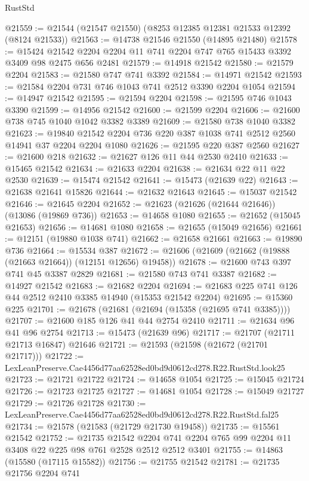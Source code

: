 \begin{lexlean}{RustStd}
\begin{coremodule}
@21559 := @21544 (@21547 @21550) (@8253 @12385 @12381 @21533 @12392 (@8124 @21533))
@21563 := @14738 @21546 @21550 (@14895 @21480)
@21578 := @15424 @21542 @2204 @2204 @11 @741 @2204 @747 @765 @15433 @3392 @3409 @98 @2475 @656 @2481
@21579 := @14918 @21542
@21580 := @21579 @2204
@21583 := @21580 @747 @741 @3392
@21584 := @14971 @21542
@21593 := @21584 @2204 @731 @746 @1043 @741 @2512 @3390 @2204 @1054
@21594 := @14947 @21542
@21595 := @21594 @2204
@21598 := @21595 @746 @1043 @3390
@21599 := @14956 @21542
@21600 := @21599 @2204
@21606 := @21600 @738 @745 @1040 @1042 @3382 @3389
@21609 := @21580 @738 @1040 @3382
@21623 := @19840 @21542 @2204 @736 @220 @387 @1038 @741 @2512 @2560 @14941 @37 @2204 @2204 @1080
@21626 := @21595 @220 @387 @2560
@21627 := @21600 @218
@21632 := @21627 @126 @11 @44 @2530 @2410
@21633 := @15465 @21542
@21634 := @21633 @2204
@21638 := @21634 @22 @11 @22 @2530
@21639 := @15474 @21542
@21641 := @15473 (@21639 @22)
@21643 := @21638 @21641 @15826
@21644 := @21632 @21643
@21645 := @15037 @21542
@21646 := @21645 @2204
@21652 := @21623 (@21626 (@21644 @21646)) (@13086 (@19869 @736))
@21653 := @14658 @1080
@21655 := @21652 (@15045 @21653)
@21656 := @14681 @1080
@21658 := @21655 (@15049 @21656)
@21661 := @12151 (@19880 @1038 @741)
@21662 := @21658 @21661
@21663 := @19890 @736
@21664 := @15534 @387
@21672 := @21606 (@21609 (@21662 (@19888 (@21663 @21664)) (@12151 @12656) @19458))
@21678 := @21600 @743 @397 @741 @45 @3387 @2829
@21681 := @21580 @743 @741 @3387
@21682 := @14927 @21542
@21683 := @21682 @2204
@21694 := @21683 @225 @741 @126 @44 @2512 @2410 @3385 @14940 (@15353 @21542 @2204)
@21695 := @15360 @225
@21701 := @21678 (@21681 (@21694 (@15358 (@21695 @741 @3385))))
@21707 := @21600 @185 @126 @41 @44 @2754 @2410
@21711 := @21634 @96 @41 @96 @2754
@21713 := @15473 (@21639 @96)
@21717 := @21707 (@21711 @21713 @16847) @21646
@21721 := @21593 (@21598 (@21672 (@21701 @21717)))
@21722 := LexLeanPreserve.Cae4456d77aa62528ed0bd9d0612cd278.R22.RustStd.look25
@21723 := @21721 @21722
@21724 := @14658 @1054
@21725 := @15045 @21724
@21726 := @21723 @21725
@21727 := @14681 @1054
@21728 := @15049 @21727
@21729 := @21726 @21728
@21730 := LexLeanPreserve.Cae4456d77aa62528ed0bd9d0612cd278.R22.RustStd.fal25
@21734 := @21578 (@21583 (@21729 @21730 @19458))
@21735 := @15561 @21542
@21752 := @21735
    @21542
    @2204
    @741
    @2204
    @765
    @99
    @2204
    @11
    @3408
    @22
    @225
    @98
    @761
    @2528
    @2512
    @2512
    @3401
@21755 := @14863 (@15580 (@17115 @15582))
@21756 := @21755 @21542
@21781 := @21735
    @21756
    @2204
    @741

\end{coremodule}
\end{lexlean}
